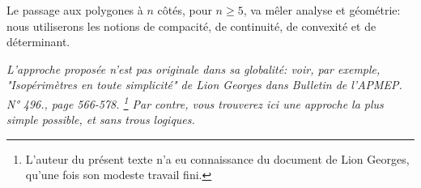 Le passage aux polygones à $n$ côtés, pour $n \geq 5$, va mêler analyse et géométrie: nous utiliserons les notions de compacité, de continuité, de convexité  et de déterminant.


\begin{tcolorbox}
	\itshape\small
	L'approche proposée n'est pas originale dans sa globalité: voir, par exemple, "Isopérimètres en toute simplicité" de Lion Georges dans Bulletin de l'APMEP. N° 496., page 566-578.%
	\footnote{
	    L'auteur du présent texte n'a eu connaissance du document de Lion Georges, qu'une fois son modeste travail fini.
	}
	Par contre, vous trouverez ici une approche la plus simple possible, et sans trous logiques.
\end{tcolorbox}

